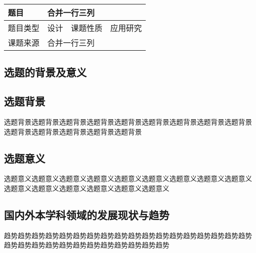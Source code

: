 
\begin{SecTab}
    \begin{tabularx}{\linewidth}{>{\centering}p{1.7cm}|p{4cm}|>{\centering}p{1.7cm}|c}
    题目&\multicolumn{3}{l}{合并一行三列}\\
    \hline 题目类型&设计&课题性质&应用研究\\
    \hline 课题来源&\multicolumn{3}{l}{合并一行三列}
    \end{tabularx}
\end{SecTab}
\begin{SecBox}
\section{选题的背景及意义}

\subsection{选题背景}
    
选题背景选题背景选题背景选题背景选题背景选题背景选题背景选题背景选题背景选题背景选题背景选题背景选题背景选题背景

\subsection{选题意义}

选题意义选题意义选题意义选题意义选题意义选题意义选题意义选题意义选题意义选题意义选题意义选题意义选题意义选题意义选题意义

\end{SecBox}
\begin{SecBox}

\section{国内外本学科领域的发展现状与趋势}

趋势趋势趋势趋势趋势趋势趋势趋势趋势趋势趋势趋势趋势趋势趋势趋势趋势趋势趋势趋势趋势趋势趋势趋势趋势趋势趋势趋势趋势趋势

\end{SecBox}

